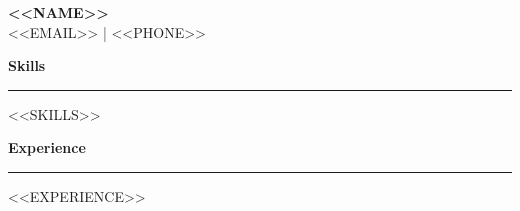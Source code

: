 \documentclass[11pt,a4paper]{article}
\begin{document}
\begin{center}
    {\Huge \textbf{<<NAME>>}} \\
    \vspace{2mm}
    <<EMAIL>> | <<PHONE>>
\end{center}

\vspace{5mm}
\noindent\textbf{\Large Skills} \\
\rule{\textwidth}{0.4pt}
<<SKILLS>>

\vspace{5mm}
\noindent\textbf{\Large Experience} \\
\rule{\textwidth}{0.4pt}
<<EXPERIENCE>>
\end{document}
